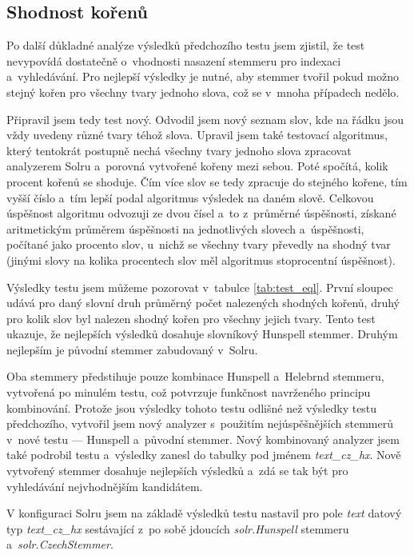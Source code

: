 \subsection{Shodnost kořenů}
Po další důkladné analýze výsledků předchozího testu jsem zjistil, že test nevypovídá dostatečně o~vhodnosti nasazení stemmeru pro indexaci a~vyhledávání. Pro nejlepší výsledky je nutné, aby stemmer tvořil pokud možno stejný kořen pro všechny tvary jednoho slova, což se v~mnoha případech nedělo.

Připravil jsem tedy test nový. Odvodil jsem nový seznam slov, kde na řádku jsou vždy uvedeny různé tvary téhož slova. Upravil jsem také testovací algoritmus, který tentokrát postupně nechá všechny tvary jednoho slova  zpracovat analyzerem Solru a~porovná vytvořené kořeny mezi sebou. Poté spočítá, kolik procent kořenů se shoduje. Čím více slov se tedy zpracuje do stejného kořene, tím vyšší číslo a~tím lepší podal algoritmus výsledek na daném slově. Celkovou úspěšnost algoritmu odvozuji ze dvou čísel a~to z~průměrné úspěšnosti, získané aritmetickým průměrem úspěšnosti na jednotlivých slovech a~úspěšnosti, počítané jako procento slov, u~nichž se všechny tvary převedly na shodný tvar (jinými slovy na kolika procentech slov měl algoritmus stoprocentní úspěšnost).

Výsledky testu jsem můžeme pozorovat v~tabulce \ref{tab:test_eql}. První sloupec udává pro daný slovní druh průměrný počet nalezených shodných kořenů, druhý pro kolik slov byl nalezen shodný kořen pro všechny jejich tvary. Tento test ukazuje, že nejlepších výsledků dosahuje slovníkový Hunspell stemmer. Druhým nejlepším je původní stemmer zabudovaný v~Solru.

Oba stemmery předstihuje pouze kombinace Hunspell a~Helebrnd stemmeru, vytvořená po minulém testu, což potvrzuje funkčnost navrženého principu kombinování. Protože jsou výsledky tohoto testu odlišné než výsledky testu předchozího, vytvořil jsem nový analyzer s~použitím nejúspěšnějších stemmerů v~nové testu --- Hunspell a~původní stemmer. Nový kombinovaný analyzer jsem také podrobil testu a~výsledky zanesl do tabulky pod jménem \emph{text\_cz\_hx}. Nově vytvořený stemmer dosahuje nejlepších výsledků a~zdá se tak být pro vyhledávání nejvhodnějším kandidátem.

V konfiguraci Solru jsem na základě výsledků testu nastavil pro pole \emph{text} datový typ \emph{text\_cz\_hx} sestávající z~po sobě jdoucích \emph{solr.Hunspell} stemmeru a~\emph{solr.CzechStemmer}.

